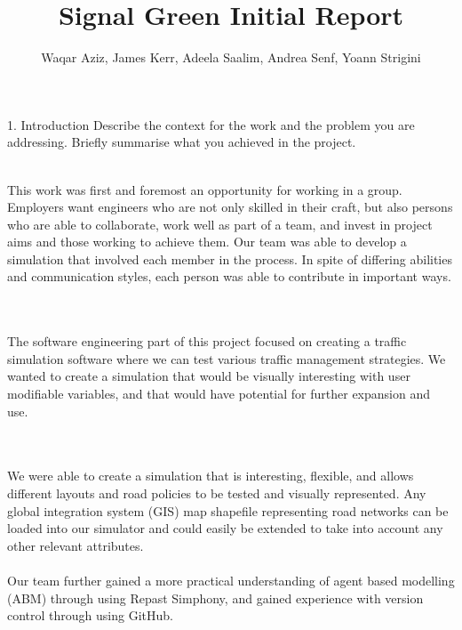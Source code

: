\documentclass[11pt]{article}
\begin{document}
\title{Signal Green Initial Report}

\author{Waqar Aziz, James Kerr, Adeela Saalim, Andrea Senf, Yoann Strigini}

\maketitle 
\section*{}







1. Introduction Describe the context for the work and the problem you are addressing. Briefly summarise what you achieved in the project.


\\
This work was first and foremost an opportunity for working in a group. Employers want engineers who are not only skilled in their craft, but also persons who are able to collaborate, work well as part of a team, and invest in project aims and those working to achieve them. Our team was able to develop a simulation that involved each member in the process. In spite of differing abilities and communication styles, each person was able to contribute in important ways.

\\ \\
The software engineering part of this project focused on creating a traffic simulation software where we can test various traffic management strategies. We wanted to create a simulation that would be visually interesting with user modifiable variables, and that would have potential for further expansion and use.

\\ \\
We were able to create a simulation that is interesting, flexible, and allows different layouts and road policies to be tested and visually represented. Any global integration system (GIS) map shapefile representing road networks can be loaded into our simulator and could easily be extended to take into account any other relevant attributes.
\\ \\

Our team further gained a more practical understanding of agent based modelling (ABM) through using Repast Simphony, and gained experience with version control through using GitHub.
\end{document}
